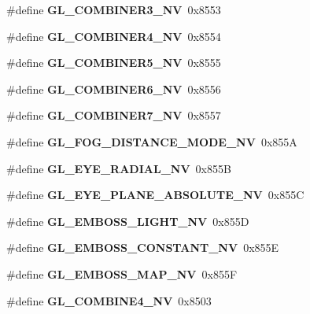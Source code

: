 \begin{DoxyCompactItemize}
\item 
\#define {\bfseries G\+L\+\_\+\+C\+O\+M\+B\+I\+N\+E\+R3\+\_\+\+N\+V}~0x8553\label{_s_d_l__opengl_8h_abc2bd15b13c6a650bbbfd150af868425}

\item 
\#define {\bfseries G\+L\+\_\+\+C\+O\+M\+B\+I\+N\+E\+R4\+\_\+\+N\+V}~0x8554\label{_s_d_l__opengl_8h_ac7df589b288a8aa76302366e0a3a4b81}

\item 
\#define {\bfseries G\+L\+\_\+\+C\+O\+M\+B\+I\+N\+E\+R5\+\_\+\+N\+V}~0x8555\label{_s_d_l__opengl_8h_a1c4e81857846568ab09f7f1f0a00955c}

\item 
\#define {\bfseries G\+L\+\_\+\+C\+O\+M\+B\+I\+N\+E\+R6\+\_\+\+N\+V}~0x8556\label{_s_d_l__opengl_8h_aa94783ba75f06b19449413f66820e636}

\item 
\#define {\bfseries G\+L\+\_\+\+C\+O\+M\+B\+I\+N\+E\+R7\+\_\+\+N\+V}~0x8557\label{_s_d_l__opengl_8h_ad364bf97d12dfc83a755d45d013ac19a}

\item 
\#define {\bfseries G\+L\+\_\+\+F\+O\+G\+\_\+\+D\+I\+S\+T\+A\+N\+C\+E\+\_\+\+M\+O\+D\+E\+\_\+\+N\+V}~0x855\+A\label{_s_d_l__opengl_8h_aa48a9c59f8786ec0e244ea4a56dfcbb0}

\item 
\#define {\bfseries G\+L\+\_\+\+E\+Y\+E\+\_\+\+R\+A\+D\+I\+A\+L\+\_\+\+N\+V}~0x855\+B\label{_s_d_l__opengl_8h_ae1245e40b905b669041d64099397dbf8}

\item 
\#define {\bfseries G\+L\+\_\+\+E\+Y\+E\+\_\+\+P\+L\+A\+N\+E\+\_\+\+A\+B\+S\+O\+L\+U\+T\+E\+\_\+\+N\+V}~0x855\+C\label{_s_d_l__opengl_8h_a300d9fc4afa246ce40cad073967f3cc1}

\item 
\#define {\bfseries G\+L\+\_\+\+E\+M\+B\+O\+S\+S\+\_\+\+L\+I\+G\+H\+T\+\_\+\+N\+V}~0x855\+D\label{_s_d_l__opengl_8h_a9743a3182ce8de77d10238cbe33a96a1}

\item 
\#define {\bfseries G\+L\+\_\+\+E\+M\+B\+O\+S\+S\+\_\+\+C\+O\+N\+S\+T\+A\+N\+T\+\_\+\+N\+V}~0x855\+E\label{_s_d_l__opengl_8h_aa90eb3af667185519e3459b19a0b46bf}

\item 
\#define {\bfseries G\+L\+\_\+\+E\+M\+B\+O\+S\+S\+\_\+\+M\+A\+P\+\_\+\+N\+V}~0x855\+F\label{_s_d_l__opengl_8h_af62bba70e9f898b7753ce6b1fd6bf6f4}

\item 
\#define {\bfseries G\+L\+\_\+\+C\+O\+M\+B\+I\+N\+E4\+\_\+\+N\+V}~0x8503\label{_s_d_l__opengl_8h_adfaf3a53223044e9aa16518406395483}


\end{DoxyCompactItemize}
